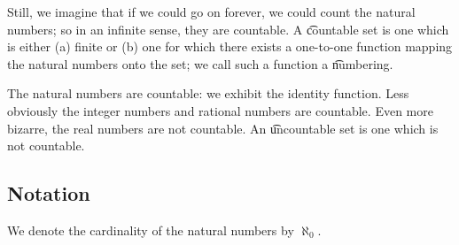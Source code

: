 Still, we imagine that if we could go on forever, we could count
the natural numbers; so in an infinite sense, they are countable.
A \t{countable} set is one which is either (a) finite or (b) one for which there exists a one-to-one function mapping the natural numbers onto the set; we call such a function a \t{numbering}.

The natural numbers are countable: we exhibit the identity function.
Less obviously the integer numbers and rational numbers are countable.
Even more bizarre, the real numbers are not countable.
An \t{uncountable} set is one which is not countable.

\subsection*{Notation}

We denote the cardinality of the natural numbers by $\aleph_0$.
